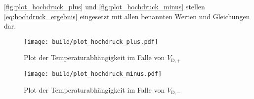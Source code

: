 \autoref{fig:plot_hochdruck_plus} und \autoref{fig:plot_hochdruck_minus} stellen \autoref{eq:hochdruck_ergebnis} eingesetzt mit allen benannten Werten und Gleichungen dar.

\begin{figure}
    \centering
    \texttt{[image: build/plot\_hochdruck\_plus.pdf]}
    \caption{Plot der Temperaturabhängigkeit im Falle von $V_{\text{D},+}$}
    \label{fig:plot_hochdruck_plus}
\end{figure}

\begin{figure}
    \centering
    \texttt{[image: build/plot\_hochdruck\_minus.pdf]}
    \caption{Plot der Temperaturabhängigkeit im Falle von $V_{\text{D},-}$}
    \label{fig:plot_hochdruck_minus}
\end{figure}